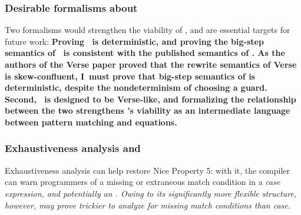 \documentclass[manuscript,screen,review, 12pt, nonacm]{acmart}
\begin{document}
        \subsubsection{Desirable formalisms about \VMinus}
        Two formalisms would strengthen the viability of \VMinus, and are
        essential targets for future work: \bf{Proving \VMinus~is
        deterministic}, and \bf{proving the big-step semantics of \VMinus~is
        consistent with the published semantics of \VC.} As the authors of the
        Verse paper proved that the rewrite semantics of Verse is
        skew-confluent, I~must prove that big-step semantics of \VMinus is
        deterministic, despite the nondeterminism of choosing a guard. Second,
        \VMinus~is designed to be Verse-like, and formalizing the relationship
        between the two strengthens \VMinus's viability as an intermediate
        language between pattern matching and equations. 


        \subsubsection{Exhaustiveness analysis \PPlus and \VMinus}
        \label{typingppandvm}

        Exhaustiveness analysis can help restore Nice Property 5: with it,
        the compiler can warn programmers of a missing or extraneous match
        condition in a \it{case} expression, and potentially an \iffibf.
        Owing to its significantly more flexible structure, however, \iffibf
        may prove trickier to analyze for missing match conditions than
        \it{case}.


\end{document}
